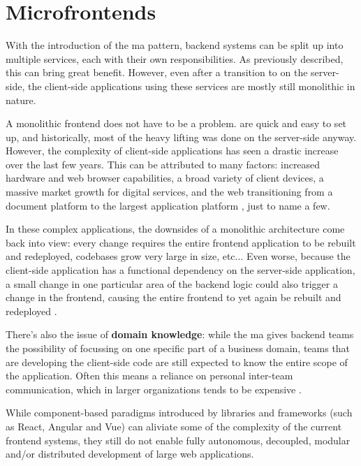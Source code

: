 \section{Microfrontends}

With the introduction of the \gls{ma} pattern, \gls{backend} systems can be
split up into multiple services, each with their own responsibilities. As
previously described, this can bring great benefit. However, even after a
transition to  on the server-side, the client-side
applications using these services are mostly still \gls{monolithic} in nature.

A \gls{monolithic} \gls{frontend} does not have to be a problem.
 are quick and easy to set up, and historically, most of the
heavy lifting was done on the server-side anyway. However, the complexity of
client-side applications has seen a drastic increase over the last few years.
This can be attributed to many factors: increased hardware and web browser
capabilities, a broad variety of client devices, a massive market growth for
digital services, and the web transitioning from a document platform to the
largest application platform \autocite{Ball_2019}, just to name a few.

In these complex applications, the downsides of a \gls{monolithic} architecture
come back into view: every change requires the entire \gls{frontend} application
to be rebuilt and redeployed, codebases grow very large in size, etc... Even
worse, because the client-side application has a functional dependency on the
server-side application, a small change in one particular area of the
\gls{backend} logic could also trigger a change in the \gls{frontend}, causing
the entire \gls{frontend} to yet again be rebuilt and redeployed
\autocite{Rappl_LogRocket_2019}.

There's also the issue of \textbf{domain knowledge}: while the \gls{ma} gives
\gls{backend} teams the possibility of focussing on one specific part of a
business domain, teams that are developing the client-side code are still
expected to know the entire scope of the application. Often this means a
reliance on personal inter-team communication, which in larger organizations
tends to be expensive \autocite{Geers_2020}. 

While component-based paradigms introduced by libraries and frameworks (such as
React,
Angular and
Vue) can aliviate some of the complexity of the
current frontend systems, they still do not enable  fully autonomous, decoupled,
modular and/or distributed development of large web applications.

